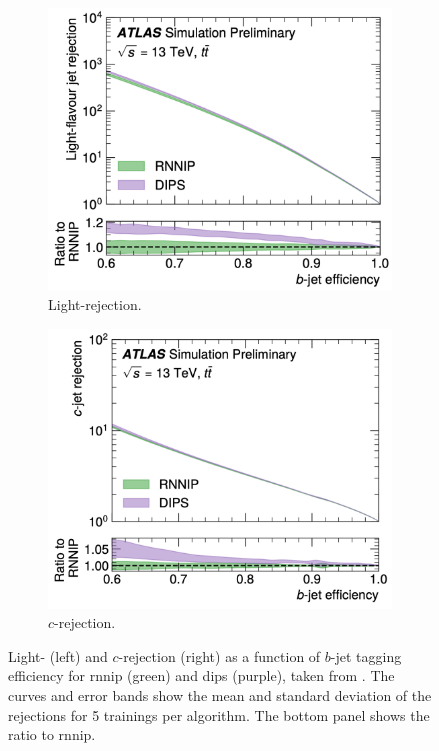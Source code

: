 \begin{figure}[h!]
  \centering
  \begin{subfigure}[b]{0.48\textwidth}
      \centering
      \includegraphics[width=\textwidth]{Images/FTAG/dipsrnnipL.png}
      \caption{Light-rejection.} 
      \label{fig:dipsrnnipPerfL}
  \end{subfigure}
  \hfill
  \begin{subfigure}[b]{0.48\textwidth}
      \centering
      \includegraphics[width=\textwidth]{Images/FTAG/dipsrnnipC.png}
      \caption{$c$-rejection.} 
      \label{fig:dipsrnnipPerfC}
  \end{subfigure}
  \caption{Light- (left) and $c$-rejection (right) as a function of $b$-jet tagging efficiency for \gls{rnnip} (green) and \gls{dips} (purple), taken from \cite{ATL-PHYS-PUB-2020-014}. The curves and error bands show the mean and standard deviation of the rejections for 5 trainings per algorithm. The bottom panel shows the ratio to \gls{rnnip}.}
  \label{fig:dipsrnnipPerf}
\end{figure} 

